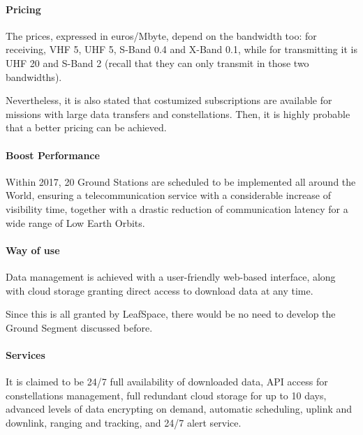 \paragraph{Pricing}
The prices, expressed in euros/Mbyte, depend on the bandwidth too: for receiving, VHF 5, UHF 5, S-Band 0.4 and X-Band 0.1, while for transmitting it is UHF 20 and S-Band 2 (recall that they can only transmit in those two bandwidths). 

Nevertheless, it is also stated that costumized subscriptions are available for missions with large data transfers and constellations. Then, it is highly probable that a better pricing can be achieved. 

\paragraph{Boost Performance}
Within 2017, 20 Ground Stations are scheduled to be implemented all around the World, ensuring a telecommunication service with a considerable increase of visibility time, together with a drastic reduction of communication latency for a wide range of Low Earth Orbits. 

\paragraph{Way of use}
Data management is achieved with a user-friendly web-based interface, along with cloud storage granting direct access to download data at any time. 

Since this is all granted by LeafSpace, there would be no need to develop the Ground Segment discussed before. 

\paragraph{Services}
It is claimed to be 24/7 full availability of downloaded data, API access for constellations management, full redundant cloud storage for up to 10 days, advanced levels of data encrypting on demand, automatic scheduling, uplink and downlink, ranging and tracking, and 24/7 alert service. 

